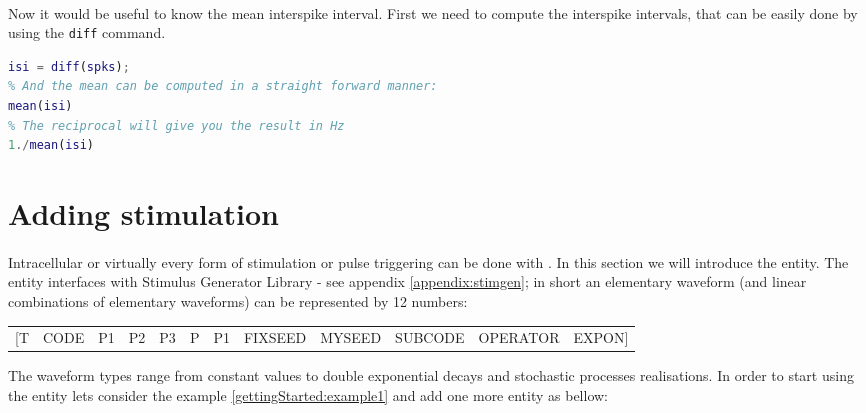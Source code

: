\paragraph{}
Now it would be useful to know the mean interspike interval. First we
need to compute the interspike intervals, that can be easily done by
using the \texttt{diff} command. 

\begin{lstlisting}[language=matlab,morekeywords={findpeaks,THRESHOLD,MINPEAKDISTANCE},escapeinside=\{\}]
% Compute te interspike intervals
isi = diff(spks);
% And the mean can be computed in a straight forward manner:
mean(isi)
% The reciprocal will give you the result in Hz
1./mean(isi)
\end{lstlisting}

\section{Adding stimulation}
\paragraph{}
Intracellular or virtually every form of stimulation or pulse
triggering can be done with \progname. In this section we will
introduce the  entity.
The  entity interfaces with Stimulus
Generator Library - see appendix \ref{appendix:stimgen}; in short an
elementary waveform (and linear combinations of elementary waveforms)
can be represented by 12 numbers:

\begin{center}
\footnotesize\ttfamily
\begin{tabular}{rrrrrrrrrrrr}
[T & CODE & P1 & P2 & P3 & P & P1 & FIXSEED & MYSEED & SUBCODE & OPERATOR & EXPON]
\end{tabular}
\end{center}

The waveform types range from constant values to double exponential
decays and stochastic processes realisations. In order to start using
the  entity lets consider the example
\ref{gettingStarted:example1} and add one more entity as bellow:

